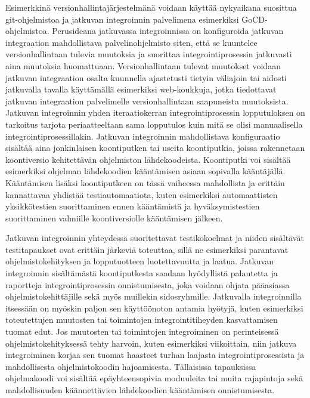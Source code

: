   Esimerkkinä ver\-si\-on\-hal\-lin\-ta\-jär\-jes\-tel\-mä\-nä  voidaan käyttää nykyaikana suosittua git-oh\-jel\-mis\-to\-a  ja jatkuvan integroinnin palvelimena esimerkiksi GoCD-oh\-jel\-mis\-to\-a.
  Perusideana jatkuvassa integroinnissa on konfiguroida jatkuvan integraation mahdollistava palvelinohjelmisto siten, että se kuuntelee versionhallintaan tulevia muutoksia ja suorittaa integrointiprosessin jatkuvasti aina muutoksia huomattuaan.
  Versionhallintaan tulevat muutokset voidaan jatkuvan integraation osalta kuunnella ajastetusti tietyin väliajoin tai aidosti jatkuvalla tavalla käyttämällä esimerkiksi web-koukkuja, jotka tiedottavat jatkuvan integraation palvelimelle versionhallintaan saapuneista muutoksista.
  Jatkuvan integroinnin yhden iteraatiokerran integrointiprosessin lopputuloksen on tarkoitus tarjota periaatteeltaan sama lopputulos kuin mitä se olisi manuaalisella integrointiprosessillakin.
  Jatkuvan integroinnin mahdollistava konfiguraatio sisältää aina jonkinlaisen koontiputken tai useita koontiputkia, joissa rakennetaan koontiversio kehitettävän ohjelmiston lähdekoodeista.
  Koontiputki voi sisältää esimerkiksi ohjelman lähdekoodien kääntämisen asiaan sopivalla kääntäjällä.
  Kääntämisen lisäksi koontiputkeen on tässä vaiheessa mahdollista ja erittäin kannattavaa yhdistää testiautomaatiota, kuten esimerkiksi automaattisten yksikkötestien suorittaminen ennen kääntämistä ja hyväksymistestien suorittaminen valmiille koontiversiolle kääntämisen jälkeen.

  Jatkuvan integroinnin yhteydessä suoritettavat testikokoelmat ja niiden sisältävät testitapaukset ovat erittäin järkeviä toteuttaa, sillä ne esimerkiksi parantavat ohjelmistokehityksen ja lopputuotteen luotettavuutta ja laatua.
  Jatkuvan integroinnin sisältämästä koontiputkesta saadaan hyödyllistä palautetta ja raportteja integrointiprosessin onnistumisesta, joka voidaan ohjata pääasiassa ohjelmistokehittäjille sekä myös muillekin sidosryhmille.
  Jatkuvalla integroinnilla itsessään on myöskin paljon sen käyttöönoton antamia hyötyjä, kuten esimerkiksi toteutettujen muutosten tai toimintojen integrointitiheyden kasvattamisen tuomat edut.
  Jos muutosten tai toimintojen integroiminen on perinteisessä ohjelmistokehityksessä tehty harvoin, kuten esimerkiksi viikoittain, niin jatkuva integroiminen korjaa sen tuomat haasteet turhan laajasta integrointiprosessista ja mahdollisesta ohjelmistokoodin hajoamisesta.
  Tällaisissa tapauksissa ohjelmakoodi voi sisältää epäyhteensopivia moduuleita tai muita rajapintoja sekä mahdollisuuden käännettävien lähdekoodien kääntämisen onnistumisesta.

